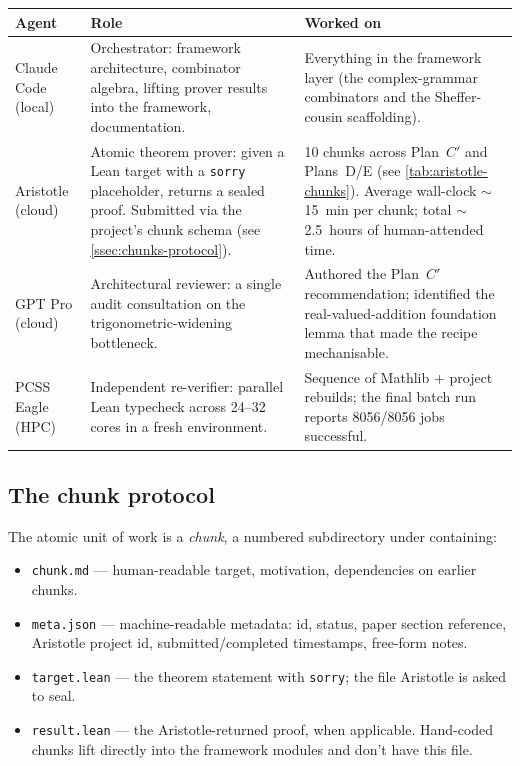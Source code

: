 \documentclass[11pt,a4paper]{article}
\theoremstyle{plain}
\theoremstyle{definition}
\begin{document}
\begin{center}
\small
\renewcommand{\arraystretch}{1.15}
\begin{tabularx}{\linewidth}{@{}l X X@{}}
\toprule
\textbf{Agent} & \textbf{Role} & \textbf{Worked on} \\
\midrule
Claude Code (local) & Orchestrator: framework architecture,
combinator algebra, lifting prover results into the framework,
documentation.
& Everything in the framework layer (the complex-grammar
combinators and the Sheffer-cousin scaffolding). \\

Aristotle (cloud) & Atomic theorem prover: given a Lean target with
a \texttt{sorry} placeholder, returns a sealed proof. Submitted via
the project's chunk schema (see \cref{ssec:chunks-protocol}).
& 10 chunks across Plan~$C'$ and Plans~D/E (see
\cref{tab:aristotle-chunks}). Average wall-clock $\sim$15~min per
chunk; total $\sim$2.5~hours of human-attended time. \\

GPT Pro (cloud) & Architectural reviewer: a single audit
consultation on the trigonometric-widening bottleneck.
& Authored the Plan~$C'$ recommendation; identified the
real-valued-addition foundation lemma that made the recipe
mechanisable. \\

PCSS Eagle (HPC) & Independent re-verifier: parallel Lean typecheck
across 24--32 cores in a fresh environment.
& Sequence of Mathlib + project rebuilds; the final batch run
reports 8056/8056 jobs successful. \\
\bottomrule
\end{tabularx}
\end{center}

\subsection*{The chunk protocol}\label{ssec:chunks-protocol}

The atomic unit of work is a \emph{chunk}, a numbered subdirectory
under  containing:

\begin{itemize}[topsep=2pt, itemsep=2pt]
\item \texttt{chunk.md} --- human-readable target, motivation,
  dependencies on earlier chunks.
\item \texttt{meta.json} --- machine-readable metadata: id, status,
  paper section reference, Aristotle project id, submitted/completed
  timestamps, free-form notes.
\item \texttt{target.lean} --- the theorem statement with
  \texttt{sorry}; the file Aristotle is asked to seal.
\item \texttt{result.lean} --- the Aristotle-returned proof, when
  applicable. Hand-coded chunks lift directly into the framework
  modules and don't have this file.
\end{itemize}
\end{document}
